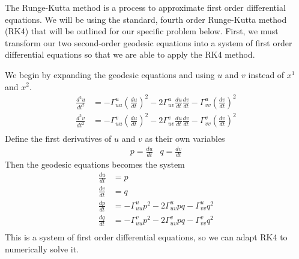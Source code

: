\documentclass[12pt]{article}
\begin{document}
		The Runge-Kutta method is a process to approximate first order differential equations.
		We will be using the standard, fourth order Runge-Kutta method (RK4) that will be outlined for our specific problem below.
		First, we must transform our two second-order geodesic equations into a system of first order differential equations so that we are able to apply the RK4 method.
		
		We begin by expanding the geodesic equations and using $u$ and $v$ instead of $x^1$ and $x^2$.
		\begin{align*} 
			\frac{d^2u}{dt^2} & = -\Gamma^u_{uu}\left(\frac{du}{dt}\right)^2-2\Gamma^u_{uv}\frac{du}{dt}\frac{dv}{dt}-\Gamma^u_{vv}\left(\frac{dv}{dt}\right)^2 \\
			\frac{d^2v}{dt^2} & = -\Gamma^v_{uu}\left(\frac{du}{dt}\right)^2-2\Gamma^v_{uv}\frac{du}{dt}\frac{dv}{dt}-\Gamma^v_{vv}\left(\frac{dv}{dt}\right)^2 \\
		\end{align*}
		Define the first derivatives of $u$ and $v$ as their own variables
		\begin{equation*} \begin{array}{cc}
			p = \frac{du}{dt} & q = \frac{dv}{dt}
		\end{array} \end{equation*}
		Then the geodesic equations becomes the system
		\begin{align*}
			\frac{du}{dt} & = p \\
			\frac{dv}{dt} & = q \\
			\frac{dp}{dt} & = -\Gamma^u_{uu}p^2-2\Gamma^u_{uv}pq-\Gamma^u_{vv}q^2 \\
			\frac{dq}{dt} & = -\Gamma^v_{uu}p^2-2\Gamma^v_{uv}pq-\Gamma^v_{vv}q^2 \\
		\end{align*}
		This is a system of first order differential equations, so we can adapt RK4 to numerically solve it.
		
\end{document}
